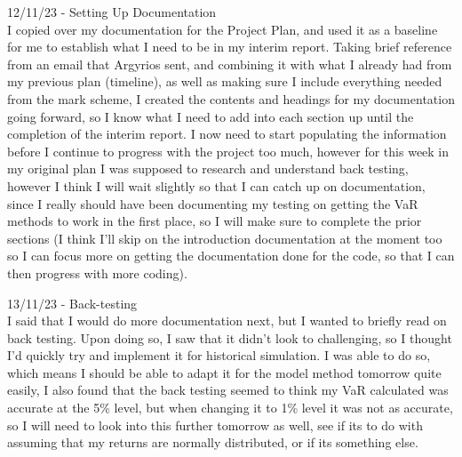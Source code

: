 \documentclass{article}
\begin{document}
12/11/23 - Setting Up Documentation\\
I copied over my documentation for the Project Plan, and used it as a baseline for me to establish what I need to be in my interim report. Taking brief reference from an email that Argyrios sent, and combining it with what I already had from my previous plan (timeline), as well as making sure I include everything needed from the mark scheme, I created the contents and headings for my documentation going forward, so I know what I need to add into each section up until the completion of the interim report. I now need to start populating the information before I continue to progress with the project too much, however for this week in my original plan I was supposed to research and understand back testing, however I think I will wait slightly so that I can catch up on documentation, since I really should have been documenting my testing on getting the VaR methods to work in the first place, so I will make sure to complete the prior sections (I think I'll skip on the introduction documentation at the moment too so I can focus more on getting the documentation done for the code, so that I can then progress with more coding).\\\vspace{0.3cm}

13/11/23 - Back-testing\\
I said that I would do more documentation next, but I wanted to briefly read on back testing. Upon doing so, I saw that it didn't look to challenging, so I thought I'd quickly try and implement it for historical simulation. I was able to do so, which means I should be able to adapt it for the model method tomorrow quite easily, I also found that the back testing seemed to think my VaR calculated was accurate at the 5\% level, but when changing it to 1\% level it was not as accurate, so I will need to look into this further tomorrow as well, see if its to do with assuming that my returns are normally distributed, or if its something else.\\\vspace{0.3cm}
\end{document}
